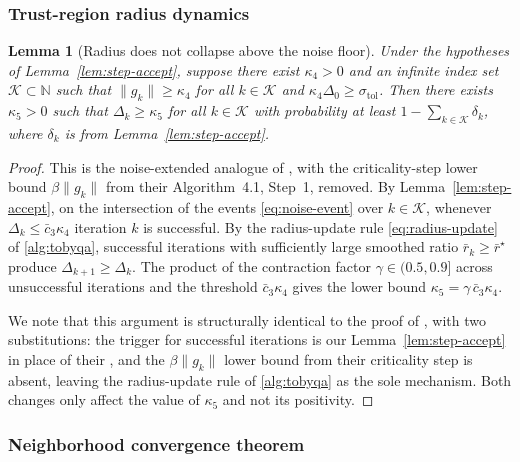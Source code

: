 \documentclass[11pt,a4paper]{article}
\newtheorem{lemma}[theorem]{Lemma}
\begin{document}
\subsubsection*{Trust-region radius dynamics}

\begin{lemma}[Radius does not collapse above the noise floor]
\label{lem:radius-floor}
Under the hypotheses of Lemma~\ref{lem:step-accept}, suppose
there exist $\kappa_4>0$ and an infinite index set
$\mathcal{K}\subset\mathbb{N}$ such that
$\|g_k\|\ge\kappa_4$ for all $k\in\mathcal{K}$ and
$\kappa_4\Delta_0\ge\sigma_{\mathrm{tol}}$. Then there exists
$\kappa_5>0$ such that
$\Delta_k\ge\kappa_5$ for all $k\in\mathcal{K}$ with probability
at least $1-\sum_{k\in\mathcal{K}}\delta_k$, where $\delta_k$ is
from Lemma~\ref{lem:step-accept}.
\end{lemma}

\begin{proof}
This is the noise-extended analogue of
\cite[Lemma~5.3]{ConnScheinbergVicente2009SIOPT}, with the
criticality-step lower bound $\beta\|g_k\|$ from their
Algorithm~4.1, Step~1, removed. By
Lemma~\ref{lem:step-accept}, on the intersection of the events
\eqref{eq:noise-event} over $k\in\mathcal{K}$, whenever
$\Delta_k\le\bar c_3\kappa_4$ iteration $k$ is successful. By
the radius-update rule \eqref{eq:radius-update} of
\eqref{alg:tobyqa}, successful iterations with sufficiently large
smoothed ratio $\bar r_k\ge\bar r^\star$ produce
$\Delta_{k+1}\ge\Delta_k$. The product of the contraction factor
$\gamma\in(0.5,0.9]$ across unsuccessful iterations and the
threshold $\bar c_3\kappa_4$ gives the lower bound
$\kappa_5=\gamma\,\bar c_3\kappa_4$.

We note that this argument is structurally identical to the
proof of \cite[Lemma~5.3]{ConnScheinbergVicente2009SIOPT}, with
two substitutions: the trigger for successful iterations is our
Lemma~\ref{lem:step-accept} in place of their
\cite[Lemma~5.2]{ConnScheinbergVicente2009SIOPT}, and the
$\beta\|g_k\|$ lower bound from their criticality step is
absent, leaving the radius-update rule of \eqref{alg:tobyqa} as
the sole mechanism. Both changes only affect the value of
$\kappa_5$ and not its positivity.
\end{proof}

\subsubsection*{Neighborhood convergence theorem}
\end{document}
